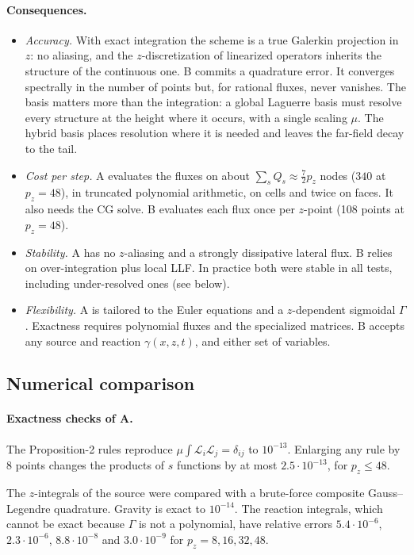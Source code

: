 \documentclass[11pt,a4paper]{article}
\newcommand{\Lag}{\mathscr{L}}
\begin{document}
\paragraph{Consequences.}
\begin{itemize}
\item \emph{Accuracy.} With exact integration the scheme is a true Galerkin
  projection in $z$: no aliasing, and the $z$-discretization of linearized
  operators inherits the structure of the continuous one. B commits a quadrature
  error. It converges spectrally in the number of points but, for rational fluxes,
  never vanishes. The basis matters more than the integration: a global Laguerre
  basis must resolve every structure at the height where it occurs, with a single
  scaling $\mu$. The hybrid basis places resolution where it is needed and leaves the
  far-field decay to the tail.
\item \emph{Cost per step.} A evaluates the fluxes on about
  $\sum_s Q_s\approx\frac72p_z$ nodes ($340$ at $p_z=48$), in truncated polynomial
  arithmetic, on cells and twice on faces. It also needs the CG solve. B evaluates
  each flux once per $z$-point (108 points at $p_z=48$).
\item \emph{Stability.} A has no $z$-aliasing and a strongly dissipative lateral flux.
  B relies on over-integration plus local LLF. In practice both were stable in all
  tests, including under-resolved ones (see below).
\item \emph{Flexibility.} A is tailored to the Euler equations and a $z$-dependent
  sigmoidal $\Gamma$. Exactness requires polynomial fluxes and the specialized
  matrices. B accepts any source and reaction $\gamma(x,z,t)$, and either set of
  variables.
\end{itemize}

\subsection{Numerical comparison}

\paragraph{Exactness checks of A.}
The Proposition-2 rules reproduce $\mu\int\Lag_i\Lag_j=\delta_{ij}$ to
$10^{-13}$. Enlarging any rule by 8 points changes the products of $s$ functions by at
most $2.5\cdot10^{-13}$, for $p_z\le48$.

The $z$-integrals of the source were compared with a brute-force composite
Gauss--Legendre quadrature. Gravity is exact to $10^{-14}$. The reaction integrals,
which cannot be exact because $\Gamma$ is not a polynomial, have relative errors
$5.4\cdot10^{-6}$, $2.3\cdot10^{-6}$, $8.8\cdot10^{-8}$ and $3.0\cdot10^{-9}$ for
$p_z=8,16,32,48$.
\end{document}
